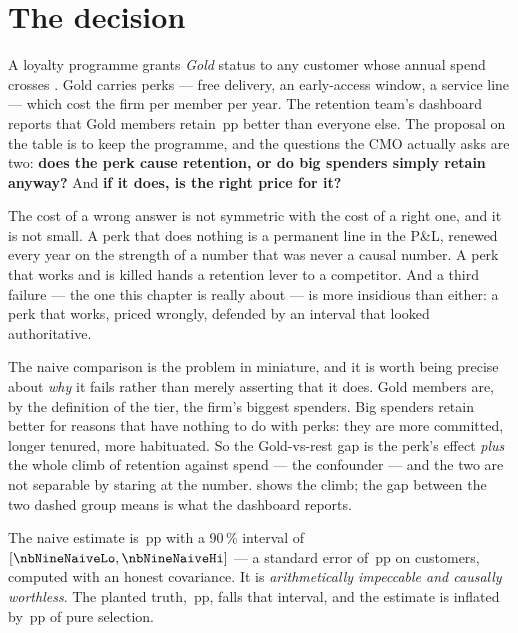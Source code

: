 \section{The decision}
\label{sec:rd:decision}

A loyalty programme grants \emph{Gold} status to any customer whose annual spend crosses
\eur{\nbNineCutoff}. Gold carries perks --- free delivery, an early-access window, a service line
--- which cost the firm \eur{\nbNinePerkCost} per member per year. The retention team's dashboard
reports that Gold members retain \nbNineNaive{}\,pp better than everyone else. The proposal on the
table is to keep the programme, and the questions the CMO actually asks are two: \textbf{does the
perk cause retention, or do big spenders simply retain anyway?} And \textbf{if it does, is
\eur{\nbNinePerkCost} the right price for it?}

The cost of a wrong answer is not symmetric with the cost of a right one, and it is not small. A
perk that does nothing is a permanent line in the P\&L, renewed every year on the strength of a
number that was never a causal number. A perk that works and is killed hands a retention lever to a
competitor. And a third failure --- the one this chapter is really about --- is more insidious than
either: a perk that works, priced wrongly, defended by an interval that looked authoritative.

The naive comparison is the problem in miniature, and it is worth being precise about \emph{why} it
fails rather than merely asserting that it does. Gold members are, by the definition of the tier,
the firm's biggest spenders. Big spenders retain better for reasons that have nothing to do with
perks: they are more committed, longer tenured, more habituated. So the Gold-vs-rest gap is the
perk's effect \emph{plus} the whole climb of retention against spend --- the confounder --- and the
two are not separable by staring at the number.  shows the climb; the gap
between the two dashed group means is what the dashboard reports.



The naive estimate is \nbNineNaive{}\,pp with a 90\,\% interval of
$[\nbNineNaiveLo, \nbNineNaiveHi]$ --- a standard error of \nbNineNaiveSe{}\,pp on
\nbNineN{} customers, computed with an honest \nbNineNaiveCov{} covariance. It is
\emph{arithmetically impeccable and causally worthless}. The planted truth, \nbNineTrueJump{}\,pp,
falls \nbNineNaiveVerdict{} that interval, and the estimate is inflated by \nbNineNaiveBias{}\,pp
of pure selection.

